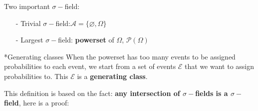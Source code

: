 \documentclass[10pt,landscape,a4paper]{article}
\makeatletter
\renewcommand{\subsection}{\@startsection{subsection}{1}{0mm}{.2ex}{.2ex}{\bfseries}}
\makeatother
\begin{document}
\begin{multicols*}{5}
Two important $\sigma-$field:
\begin{itemize}
    \item[-] Trivial $\sigma-$field:$\mathcal{A}=\{\varnothing,\Omega\}$
    \item[-] Largest $\sigma-$field: \textbf{powerset} of $\Omega$, $\mathcal{P}(\Omega)$
\end{itemize}

\subsection*{Generating classes}
When the powerset has too many events to be assigned probabilities to each event, we start from a set of events $\mathcal{E}$ that we want to assign probabilities to. This $\mathcal{E}$ is a \textbf{generating class}.

 \vspace{2pt}

This definition is based on the fact: \textbf{any intersection of $\sigma-$fields is a $\sigma-$field}, here is a proof:


\end{multicols*}
\end{document}

